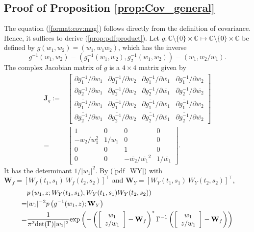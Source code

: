 \documentclass{amsart}
\begin{document}
\subsection{Proof of Proposition \ref{prop:Cov_general}}\label{sec:proof:prop:Cov_general}
The equation (\ref{format:cov:mag}) follows directly from the definition of covariance.
Hence, it suffices to derive (\ref{prop:pdf:product}).
Let $g: \mathbb{C}\setminus\{0\}\times \mathbb{C}\mapsto \mathbb{C}\setminus\{0\}\times \mathbb{C}$ be defined by $g(w_{1},w_{2}) = (w_{1},w_{1}w_{2})$, which has the inverse
$$g^{-1}(w_{1},w_{2}) =\left(g^{-1}_{1}(w_{1},w_{2}),g^{-1}_{2}(w_{1},w_{2})\right) =  (w_{1},w_{2}/w_{1}).$$
The complex Jacobian matrix of $g$ is a $4\times4$ matrix given by
\begin{align*}
\mathbf{J}_{g}:=&\left[\begin{array}{cccc}
\partial g^{-1}_{1}/\partial w_{1} & \partial g^{-1}_{1}/\partial w_{2} & \partial g^{-1}_{1}/\partial \overline{w_{1}} & \partial g^{-1}_{1}/\partial \overline{w_{2}}
\\
\partial g^{-1}_{2}/\partial w_{1} & \partial g^{-1}_{2}/\partial w_{2} & \partial g^{-1}_{2}/\partial \overline{w_{1}} & \partial g^{-1}_{2}/\partial \overline{w_{2}}
\\
\partial \overline{g^{-1}_{1}}/\partial w_{1} & \partial \overline{g^{-1}_{1}}/\partial w_{2} & \partial \overline{g^{-1}_{1}}/\partial \overline{w_{1}} & \partial \overline{g^{-1}_{1}}/\partial \overline{w_{2}}
\\
\partial \overline{g^{-1}_{2}}/\partial w_{1} & \partial \overline{g^{-1}_{2}}/\partial w_{2} & \partial \overline{g^{-1}_{2}}/\partial \overline{w_{1}} & \partial \overline{g^{-1}_{2}}/\partial \overline{w_{2}}
\end{array}\right]
\\=&\left[\begin{array}{cccc}
1 & 0 & 0 & 0
\\
-w_{2}/w_{1}^{2} & 1/w_{1} & 0 & 0
\\
0 & 0 & 1 & 0
\\
0 & 0 & -\overline{w_{2}}/\overline{w_{1}}^{2} & 1/\overline{w_{1}}
\end{array}\right].
\end{align*}
It has the determinant  $1/|w_{1}|^{2}$.
By (\ref{pdf_WY}) with $\mathbf{W}_{f} = [W_{f}(t_{1},s_{1})\ W_{f}(t_{2},s_{2})]^{\top}$
and $\mathbf{W}_{Y} = [W_{Y}(t_{1},s_{1})\ W_{Y}(t_{2},s_{2})]^{\top}$,
\begin{align}\notag
&p\left(w_{1},z;W_{Y}(t_{1},s_{1}),W_{Y}(t_{1},s_{1})W_{Y}(t_{2},s_{2})\right)
\\\notag=& |w_{1}|^{-2} p\left(g^{-1}(w_{1},z);\mathbf{W}_{Y}\right)
\\\notag=&
\frac{1}{\pi^{2}\textup{det}(\Gamma)|w_{1}|^{2}}
\textup{exp}\left(-\left(
\left[\begin{array}{cc}w_{1}\\ z/w_{1}\end{array}\right]-\mathbf{W}_{f}\right)^{*}
\Gamma^{-1}
\left(\left[\begin{array}{cc}w_{1}\\ z/w_{1}\end{array}\right]-\mathbf{W}_{f}\right)\right)
\end{align}
\end{document}
